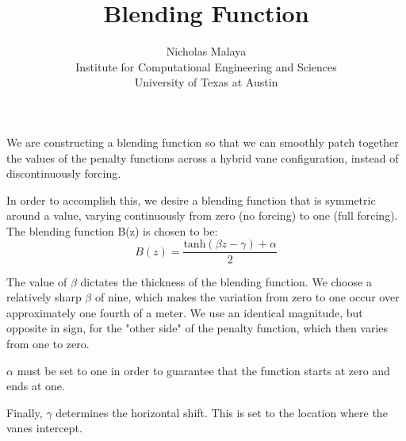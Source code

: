 \documentclass{article}
\title{\bf{Blending Function}}
\author{Nicholas Malaya \\ Institute for Computational Engineering and Sciences \\ University of Texas at Austin} \date{}
\begin{document}
\maketitle

We are constructing a blending function so that we can smoothly patch together 
the values of the penalty functions across a hybrid vane configuration, 
instead of discontinuously forcing. 

In order to accomplish this, we desire a blending function that is symmetric 
around a value, varying continuously from zero (no forcing) to one (full forcing). 
The blending function B(z) is chosen to be: 
\begin{equation}
  B(z) = \frac{\text{tanh}(\beta z -\gamma) + \alpha}{2}
\end{equation}

The value of $\beta$ dictates the thickness of the blending function. 
We choose a relatively sharp $\beta$ of nine, which makes the variation from 
zero to one occur over approximately one fourth of a meter. We use an identical 
magnitude, but opposite in sign, for the "other side" of the penalty function, which then 
varies from one to zero. 

$\alpha$ must be set to one in order to guarantee 
that the function starts at zero and ends at one. 

Finally, $\gamma$ determines the horizontal shift. This is set to the location where 
the vanes intercept. 
\end{document}
